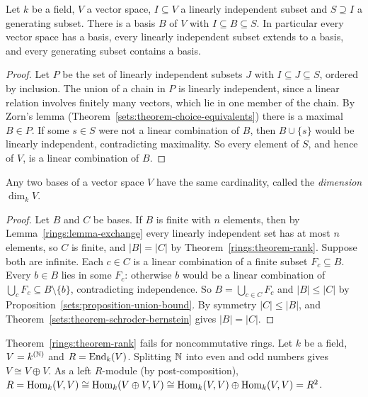 \begin{theorem}\label{rings:theorem-bases-exist}
Let $k$ be a field, $V$ a vector space, $I \subseteq V$ a linearly independent subset and
$S \supseteq I$ a generating subset. There is a basis $B$ of $V$ with $I \subseteq B \subseteq S$. In
particular every vector space has a basis, every linearly independent subset extends
to a basis, and every generating subset contains a basis.
\end{theorem}

\begin{proof}
Let $P$ be the set of linearly independent subsets $J$ with $I \subseteq J \subseteq S$, ordered
by inclusion. The union of a chain in $P$ is linearly independent, since a linear
relation involves finitely many vectors, which lie in one member of the chain. By
Zorn's lemma (Theorem~\ref{sets:theorem-choice-equivalents}) there is a maximal
$B \in P$. If some $s \in S$ were not a linear combination of $B$, then $B \cup \{s\}$ would be
linearly independent, contradicting maximality. So every element of $S$, and hence of
$V$, is a linear combination of $B$.
\end{proof}

\begin{theorem}\label{rings:theorem-dimension}
Any two bases of a vector space $V$ have the same cardinality, called the
\emph{dimension} $\dim_k V$.
\end{theorem}

\begin{proof}
Let $B$ and $C$ be bases. If $B$ is finite with $n$ elements, then by
Lemma~\ref{rings:lemma-exchange} every linearly independent set has at most $n$
elements, so $C$ is finite, and $|B| = |C|$ by Theorem~\ref{rings:theorem-rank}.
Suppose both are infinite. Each $c \in C$ is a linear combination of a finite subset
$F_c \subseteq B$. Every $b \in B$ lies in some $F_c$: otherwise $b$ would be a linear
combination of $\bigcup_c F_c \subseteq B \setminus \{b\}$, contradicting independence. So
$B = \bigcup_{c \in C} F_c$ and $|B| \leq |C|$ by Proposition~\ref{sets:proposition-union-bound}.
By symmetry $|C| \leq |B|$, and Theorem~\ref{sets:theorem-schroder-bernstein} gives
$|B| = |C|$.
\end{proof}

\begin{counterexample}\label{rings:counterexample-rank-noncommutative}
Theorem~\ref{rings:theorem-rank} fails for noncommutative rings. Let $k$ be a field,
$V = k^{(\mathbb{N})}$ and $R = \operatorname{End}_k(V)$. Splitting $\mathbb{N}$ into even and odd numbers gives
$V \cong V \oplus V$. As a left $R$-module (by post-composition),
$R = \operatorname{Hom}_k(V, V) \cong \operatorname{Hom}_k(V \oplus V, V) \cong \operatorname{Hom}_k(V, V) \oplus \operatorname{Hom}_k(V, V) = R^2$.
\end{counterexample}

